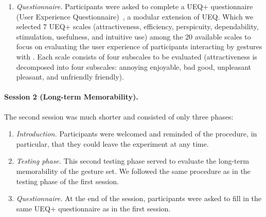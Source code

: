\begin{enumerate}
    \item \textit{Questionnaire.} Participants were asked to complete a UEQ+ questionnaire (User Experience Questionnaire)~\cite{Schrepp:2017}, a modular extension of UEQ. Which we selected 7 UEQ+ scales (\ie attractiveness, efficiency, perspicuity, dependability, stimulation, usefulness, and intuitive use) among the 20 available scales to focus on evaluating the user experience of participants interacting by gestures with \lui. Each scale consists of four subscales to be evaluated (\eg attractiveness is decomposed into four subscales: annoying \vs enjoyable, bad \vs good, unpleasant \vs pleasant, and unfriendly \vs friendly).
\end{enumerate}

\paragraph{Session 2 (Long-term Memorability).} The second session was much shorter and consisted of only three phases:
\begin{enumerate}
    \item \textit{Introduction.} Participants were welcomed and reminded of the procedure, in particular, that they could leave the experiment at any time.
    
    \item \textit{Testing phase.} This second testing phase served to evaluate the long-term memorability of the \lui gesture set. We followed the same procedure as in the testing phase of the first session.
    
    \item \textit{Questionnaire.} At the end of the session, participants were asked to fill in the same UEQ+ questionnaire as in the first session.
\end{enumerate}

